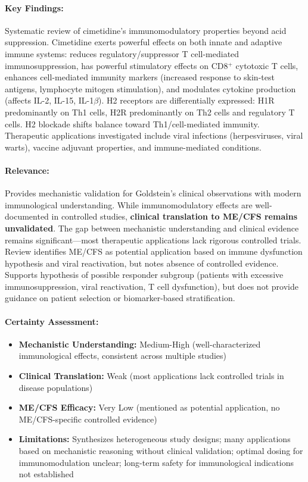 \paragraph{Key Findings:}
Systematic review of cimetidine's immunomodulatory properties beyond acid suppression. Cimetidine exerts powerful effects on both innate and adaptive immune systems: reduces regulatory/suppressor T cell-mediated immunosuppression, has powerful stimulatory effects on CD8$^+$ cytotoxic T cells, enhances cell-mediated immunity markers (increased response to skin-test antigens, lymphocyte mitogen stimulation), and modulates cytokine production (affects IL-2, IL-15, IL-1$\beta$). H2 receptors are differentially expressed: H1R predominantly on Th1 cells, H2R predominantly on Th2 cells and regulatory T cells. H2 blockade shifts balance toward Th1/cell-mediated immunity. Therapeutic applications investigated include viral infections (herpesviruses, viral warts), vaccine adjuvant properties, and immune-mediated conditions.

\paragraph{Relevance:}
Provides mechanistic validation for Goldstein's clinical observations with modern immunological understanding. While immunomodulatory effects are well-documented in controlled studies, \textbf{clinical translation to ME/CFS remains unvalidated}. The gap between mechanistic understanding and clinical evidence remains significant---most therapeutic applications lack rigorous controlled trials. Review identifies ME/CFS as potential application based on immune dysfunction hypothesis and viral reactivation, but notes absence of controlled evidence. Supports hypothesis of possible responder subgroup (patients with excessive immunosuppression, viral reactivation, T cell dysfunction), but does not provide guidance on patient selection or biomarker-based stratification.

\paragraph{Certainty Assessment:}
\begin{itemize}
    \item \textbf{Mechanistic Understanding:} Medium-High (well-characterized immunological effects, consistent across multiple studies)
    \item \textbf{Clinical Translation:} Weak (most applications lack controlled trials in disease populations)
    \item \textbf{ME/CFS Efficacy:} Very Low (mentioned as potential application, no ME/CFS-specific controlled evidence)
    \item \textbf{Limitations:} Synthesizes heterogeneous study designs; many applications based on mechanistic reasoning without clinical validation; optimal dosing for immunomodulation unclear; long-term safety for immunological indications not established
\end{itemize}

